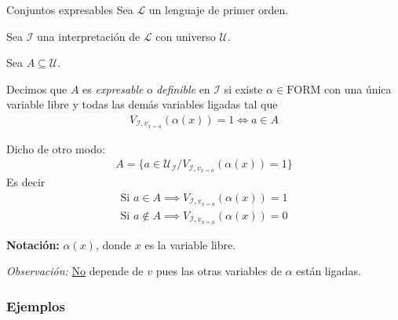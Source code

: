     \medskip

    \begin{definicion}{Conjuntos expresables}{}
        Sea $\mathcal{L}$ un lenguaje de primer orden.

        Sea $\mathcal{I}$ una interpretación de $\mathcal{L}$ con universo 
        $\mathcal{U}$.

        Sea $A \subseteq \mathcal{U}$.

        \medskip

        Decimos que $A$ es \textit{expresable} o \textit{definible} en 
        $\mathcal{I}$ si existe 
        $\alpha \in \mathrm{FORM}$ con una única  variable libre y todas las demás 
        variables ligadas tal que
        \begin{gather*}
            V_{\mathcal{I}, v_{x=a}} (\alpha(x)) = 1 \iff a \in A
        \end{gather*}

        \medskip

        Dicho de otro modo:
        \begin{gather*}
            A = \{ a \in \mathcal{U}_{\mathcal{I}} /
            V_{\mathcal{I}, v_{x=a}} (\alpha(x))=1 \}
        \end{gather*}
        Es decir
        \begin{gather*}
            \text{Si } a \in A \implies V_{\mathcal{I}, v_{x=a}} (\alpha(x)) = 1\\
            \text{Si } a \notin A \implies V_{\mathcal{I}, v_{x=a}} (\alpha(x))=0
        \end{gather*}

        \bigskip
        \textbf{Notación:}
        $\alpha(x)$, donde $x$ es la variable libre.
    \end{definicion}

    \bigskip
    \textit{Observación:}
    \underline{No} depende de $v$ pues las otras variables de $\alpha$ están 
    ligadas.

    \subsubsection{Ejemplos}

